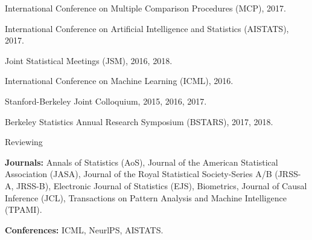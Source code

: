 \documentclass{article}
\begin{document}
\vspace{2mm}
International Conference on Multiple Comparison Procedures (MCP), 2017.

\vspace{2mm}
International Conference on Artificial Intelligence and Statistics (AISTATS), 2017.

\vspace{2mm}
Joint Statistical Meetings (JSM), 2016, 2018.

\vspace{2mm}
International Conference on Machine Learning (ICML), 2016.

\vspace{2mm}
Stanford-Berkeley Joint Colloquium, 2015, 2016, 2017.

\vspace{2mm}
Berkeley Statistics Annual Research Symposium (BSTARS), 2017, 2018.

\vspace{5mm}
\begin{large}
\noindent Reviewing
\end{large}

\vspace{2mm}
\noindent \textbf{Journals: }Annals of Statistics (AoS), Journal of the American Statistical Association (JASA), Journal of the Royal Statistical Society-Series A/B (JRSS-A, JRSS-B), Electronic Journal of Statistics (EJS), Biometrics, Journal of Causal Inference (JCL), Transactions on Pattern Analysis and Machine Intelligence (TPAMI).

\vspace{2mm}
\noindent \textbf{Conferences:} ICML, NeurlPS, AISTATS.







\end{document}
